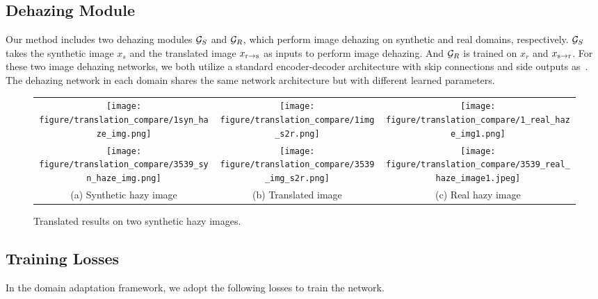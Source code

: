 \documentclass[10pt,twocolumn,letterpaper]{article}
\begin{document}
\subsection{Dehazing Module}
Our method includes two dehazing modules ${{\cal G}_S}$ and ${{\cal G}_R}$, which perform image dehazing on synthetic and real domains, respectively.
${{\cal G}_S}$ takes the synthetic image ${x_s}$ and the translated image ${x_{{\rm{r}} \to {\rm{s}}}}$ as inputs to perform image dehazing.
And ${{\cal G}_R}$ is trained on ${x_r}$ and ${x_{{\rm{s}} \to {\rm{r}}}}$.
For these two image dehazing networks, we both utilize a standard encoder-decoder architecture with skip connections and side outputs as~\cite{zheng2018t2net}.
The dehazing network in each domain shares the same network architecture but with different learned parameters.
\begin{figure}[t]
	\footnotesize
	\centering
	\renewcommand{\tabcolsep}{1pt} \renewcommand{\arraystretch}{1} \begin{center}
		\begin{tabular}{ccc}
			\texttt{[image: figure/translation\_compare/1syn\_haze\_img.png]} &
			\texttt{[image: figure/translation\_compare/1img\_s2r.png]} &
			\texttt{[image: figure/translation\_compare/1\_real\_haze\_img1.png]} \\


			\texttt{[image: figure/translation\_compare/3539\_syn\_haze\_img.png]} &
			\texttt{[image: figure/translation\_compare/3539\_img\_s2r.png]} &
			\texttt{[image: figure/translation\_compare/3539\_real\_haze\_image1.jpeg]} \\
			
(a) Synthetic hazy image &
			(b) Translated image &
			(c) Real hazy image\\
		\end{tabular}
	\end{center}
	\vspace{-2mm}
	\caption{Translated results on two synthetic hazy images. 
	}
	\vspace{-4mm}
	\label{fig:translation}
\end{figure}


\subsection{Training Losses}
In the domain adaptation framework, we adopt the following losses to train the network.
\vspace{-5mm}
\end{document}
